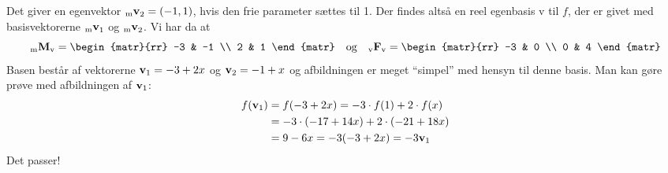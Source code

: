 \begin{example}
\begin{equation}
\end{equation}
Det giver en egenvektor $ {_\mathrm{m}\mathbf{v}}_2 = (-1,1) $, hvis den frie parameter sættes til 1. \bs
Der findes altså en reel egenbasis v til $ f $, der er givet med basisvektorerne $ {_\mathrm{m}\mathbf{v}}_1 $ og $ {_\mathrm{m}\mathbf{v}}_2 $. Vi har da at
\begin{equation}
\matind mMv = \begin{matr}{rr} -3 & -1 \\ 2 & 1 \end{matr} \quad \mathrm{og} \quad \matind vFv = \begin{matr}{rr} -3 & 0 \\ 0 & 4 \end{matr}
\end{equation}
Basen består af vektorerne $ \mathbf{v}_1 = -3 + 2x $ og $ \mathbf{v}_2 = -1 + x $ og afbildningen er meget ``simpel'' med hensyn til denne basis. \bs
Man kan gøre prøve med afbildningen af $ \mathbf{v}_1 $:
\begin{equation}
\begin{aligned}
f(\mathbf{v}_1) &= f(-3 + 2x) = -3 \cdot f(1) + 2 \cdot f(x) \\
&= -3 \cdot (-17 + 14x) +2 \cdot (-21 + 18x) \\
&= 9-6x = -3(-3+2x) = -3\mathbf{v}_1
\end{aligned}
\end{equation}
Det passer!
\end{example}




